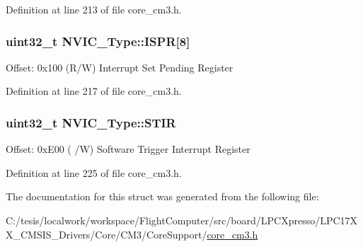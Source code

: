\-Definition at line 213 of file core\-\_\-cm3.\-h.

\hypertarget{struct_n_v_i_c___type_acf8e38fc2e97316242ddeb7ea959ab90}{
\subsubsection[{\-I\-S\-P\-R}]{ uint32\-\_\-t {\bf \-N\-V\-I\-C\-\_\-\-Type\-::\-I\-S\-P\-R}\mbox{[}8\mbox{]}}}\label{struct_n_v_i_c___type_acf8e38fc2e97316242ddeb7ea959ab90}
\-Offset\-: 0x100 (\-R/\-W) \-Interrupt \-Set \-Pending \-Register 

\-Definition at line 217 of file core\-\_\-cm3.\-h.

\hypertarget{struct_n_v_i_c___type_a0b0d7f3131da89c659a2580249432749}{
\subsubsection[{\-S\-T\-I\-R}]{ uint32\-\_\-t {\bf \-N\-V\-I\-C\-\_\-\-Type\-::\-S\-T\-I\-R}}}\label{struct_n_v_i_c___type_a0b0d7f3131da89c659a2580249432749}
\-Offset\-: 0x\-E00 ( /\-W) \-Software \-Trigger \-Interrupt \-Register 

\-Definition at line 225 of file core\-\_\-cm3.\-h.



\-The documentation for this struct was generated from the following file\-:\begin{DoxyCompactItemize}
\item 
\-C\-:/tesis/localwork/workspace/\-Flight\-Computer/src/board/\-L\-P\-C\-Xpresso/\-L\-P\-C17\-X\-X\-\_\-\-C\-M\-S\-I\-S\-\_\-\-Drivers/\-Core/\-C\-M3/\-Core\-Support/\hyperlink{core__cm3_8h}{core\-\_\-cm3.\-h}\end{DoxyCompactItemize}
